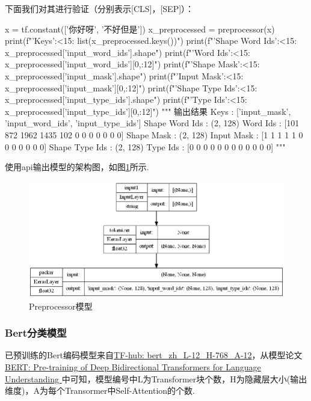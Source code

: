 \documentclass[12pt, a4paper, oneside]{ctexart}
\numberwithin{equation}{section}  %
\begin{document}
下面我们对其进行验证（分别表示[CLS]，[SEP]）：
\begin{pythoncode}
x = tf.constant(['你好呀', '不好但是'])
x_preprocessed = preprocessor(x)
print(f"{'Keys':<15}: {list(x_preprocessed.keys())}")
print(f"{'Shape Word Ids':<15}: {x_preprocessed['input_word_ids'].shape}")
print(f"{'Word Ids':<15}: {x_preprocessed['input_word_ids'][0,:12]}")
print(f"{'Shape Mask':<15}: {x_preprocessed['input_mask'].shape}")
print(f"{'Input Mask':<15}: {x_preprocessed['input_mask'][0,:12]}")
print(f"{'Shape Type Ids':<15}: {x_preprocessed['input_type_ids'].shape}")
print(f"{'Type Ids':<15}: {x_preprocessed['input_type_ids'][0,:12]}")
""" 输出结果
Keys           : ['input_mask', 'input_word_ids', 'input_type_ids']
Shape Word Ids : (2, 128)
Word Ids       : [101 872 1962 1435 102  0  0  0  0  0  0  0]
Shape Mask     : (2, 128)
Input Mask     : [1 1 1 1 1 0 0 0 0 0 0 0]
Shape Type Ids : (2, 128)
Type Ids       : [0 0 0 0 0 0 0 0 0 0 0 0]
"""
\end{pythoncode}
使用api输出模型的架构图，如图\ref{fig-preprocessor}所示.
\begin{figure}[htbp]
  \centering
  \includegraphics[scale=0.5]{Preprocessor.png}
  \setlength{\abovecaptionskip}{0cm}
  \caption{Preprocessor模型}
  \label{fig-preprocessor}
\end{figure}

\subsubsection{Bert分类模型}
已预训练的Bert编码模型来自\href{https://tfhub.dev/tensorflow/bert_zh_L-12_H-768_A-12/4}{TF-hub: bert\_zh\_L-12\_H-768\_A-12}，从模型论文\href{https://arxiv.org/pdf/1810.04805.pdf}{BERT: Pre-training of Deep Bidirectional Transformers for Language Understanding
}中可知，模型编号中L为Transformer块个数，H为隐藏层大小(输出维度)，A为每个Transormer中Self-Attention的个数. 
\end{document}
